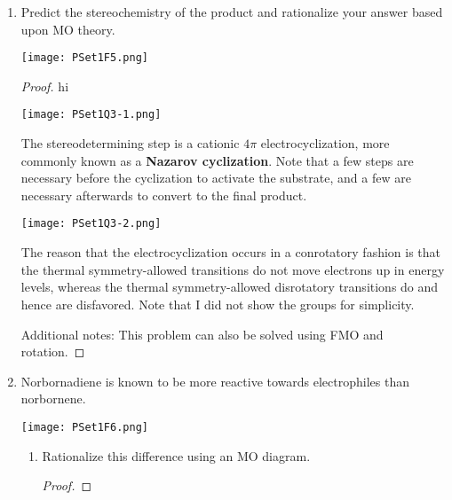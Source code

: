\documentclass[../psets.tex]{subfiles}
\begin{document}
\begin{enumerate}
\begin{enumerate}
\begin{proof}
        \end{proof}
        \item Can the two radical centers delocalize via resonance? Explain using the MO diagram from part (a).
        \begin{proof}
             Per the MO diagram, we still have a diradical in the HOMO, and each radical electron is localized in an MO on one side of the molecule.
        \end{proof}
    \end{enumerate}
    \item Predict the stereochemistry of the product and rationalize your answer based upon MO theory.
    \begin{center}
        \texttt{[image: PSet1F5.png]}
    \end{center}
    \begin{proof}
        {\color{white}hi}
        \begin{center}
            \texttt{[image: PSet1Q3-1.png]}
        \end{center}
        The stereodetermining step is a cationic $4\pi$ electrocyclization, more commonly known as a \textbf{Nazarov cyclization}. Note that a few steps are necessary before the cyclization to activate the substrate, and a few are necessary afterwards to convert to the final product.
        \begin{center}
            \texttt{[image: PSet1Q3-2.png]}
        \end{center}
        The reason that the electrocyclization occurs in a conrotatory fashion is that the thermal symmetry-allowed transitions do not move electrons up in energy levels, whereas the thermal symmetry-allowed disrotatory transitions do and hence are disfavored. Note that I did not show the  groups for simplicity.\par
        Additional notes: This problem can also be solved using FMO and rotation.
    \end{proof}
    \item Norbornadiene is known to be more reactive towards electrophiles than norbornene.
    \begin{center}
        \texttt{[image: PSet1F6.png]}
    \end{center}
    \begin{enumerate}
        \item Rationalize this difference using an MO diagram.
        \begin{proof}

\end{proof}
\end{enumerate}
\end{enumerate}
\end{document}
